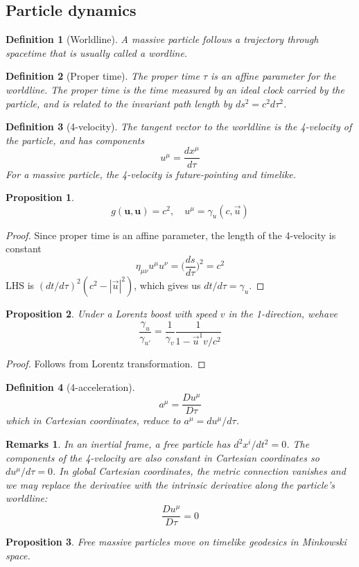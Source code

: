 \documentclass[a4paper]{article}
\newtheorem{remarks}{Remarks}[section]
\theoremstyle{new}
\newtheorem{defi}{Definition}[section]
\newtheorem{prop}{Proposition}[section]
\begin{document}
\subsection{Particle dynamics}
\begin{defi}[Worldline]
A massive particle follows a trajectory through spacetime that is usually called a wordline.
\end{defi}
\begin{defi}[Proper time]
The proper time $\tau$ is an affine parameter for the worldline. The proper time is the time measured by an ideal clock carried by the particle, and is related to the invariant path length by $ds^2=c^2d\tau^2$.
\end{defi}
\begin{defi}[4-velocity]
The tangent vector to the worldline is the 4-velocity of the particle, and has components
$$u^\mu=\frac{dx^\mu}{d\tau}$$
For a massive particle, the 4-velocity is future-pointing and timelike.
\end{defi}
\begin{prop}
$$g(\mathbf{u},\mathbf{u})=c^2,\quad u^\mu=\gamma_u(c,\vec{u})$$
\end{prop}
\begin{proof}
Since proper time is an affine parameter, the length of the 4-velocity is constant
$$\eta_{\mu\nu}u^\mu u^\nu=\bigg(\frac{ds}{d\tau}\bigg)^2=c^2$$
LHS is $(dt/d\tau)^2(c^2-|\vec{u}|^2)$, which gives us $dt/d\tau=\gamma_u$.
\end{proof}
\begin{prop}
Under a Lorentz boost with speed $v$ in the 1-direction, wehave
$$\frac{\gamma_u}{\gamma_{u'}}=\frac{1}{\gamma_v}\frac{1}{1-\vec{u}^1v/c^2}$$
\end{prop}
\begin{proof}
Follows from Lorentz transformation.
\end{proof}
\begin{defi}[4-acceleration]
$$a^\mu=\frac{Du^\mu}{D\tau}$$
which in Cartesian coordinates, reduce to $a^\mu=du^\mu/d\tau$.
\end{defi}
\begin{remarks}
In an inertial frame, a free particle has $d^2x^i/dt^2=0$. The components of the 4-velocity are also constant in Cartesian coordinates so $du^\mu/d\tau=0$. In global Cartesian coordinates, the metric connection vanishes and we may replace the derivative with the intrinsic derivative along the particle's worldline:
$$\frac{Du^\mu}{D\tau}=0$$
\end{remarks}
\begin{prop}
Free massive particles move on timelike geodesics in Minkowski space.
\end{prop}
\end{document}
